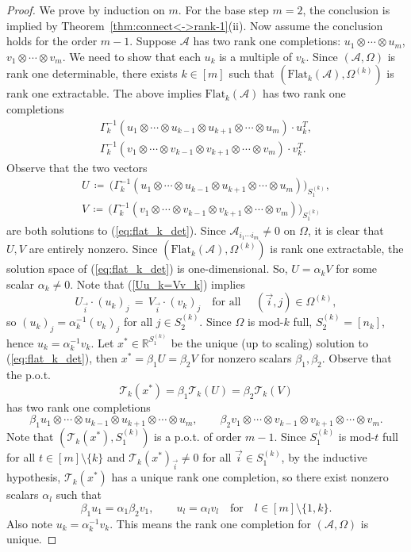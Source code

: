 \documentclass{amsart}
\newcommand{\re}{\mathbb{R}}
\def\af{\alpha}
\def\bt{\beta}
\newcommand{\reff}[1]{(\ref{#1})}
\newcommand{\mc}[1]{\mathcal{#1}}
\newcommand{\Flat}{\mbox{Flat}}
\newcommand{\be}{\begin{equation}}
\newcommand{\ee}{\end{equation}}
\newcommand{\baray}{\begin{array}}
\newcommand{\earay}{\end{array}}
\theoremstyle{definition}
\numberwithin{equation}{section}
\begin{document}
\begin{proof}
We prove by induction on $m$.
For the base step $m=2$, the conclusion is implied by Theorem~\ref{thm:connect<->rank-1}(ii).
Now assume the conclusion holds for the order $m-1$. 
Suppose $\mc{A}$ has two rank one completions:
$u_1 \otimes \cdots \otimes u_m$, $v_1 \otimes \cdots \otimes v_m$.
We need to show that each $u_k$ is a multiple of $v_k$.
Since $(\mc{A}, \Omega)$ is rank one determinable, there exists $k \in [m]$ such that $(\Flat_k(\mc{A}), \Omega^{(k)})$ is rank one extractable. 
The above implies $\Flat_k(\mc{A})$ has two rank one completions
\be\label{Uu_k=Vv_k}
\baray{l}
\Gamma_k^{-1}(u_1 \otimes \cdots \otimes u_{k-1} \otimes u_{k+1} \otimes \cdots \otimes u_m )  \cdot u_k^T, \\
\Gamma_k^{-1}(v_1 \otimes \cdots \otimes v_{k-1} \otimes v_{k+1} \otimes \cdots \otimes v_m ) \cdot v_k^T.
\earay
\ee
Observe that the two vectors
\[
\baray{l}
U \,\coloneqq\, \big( \Gamma_k^{-1}(u_1 \otimes \cdots \otimes u_{k-1} \otimes u_{k+1} \otimes \cdots \otimes u_m )  \big)_{S_1^{(k)}}, \\
V \,\coloneqq\, \big( \Gamma_k^{-1}(v_1 \otimes \cdots \otimes v_{k-1} \otimes v_{k+1} \otimes \cdots \otimes v_m )  \big)_{S_1^{(k)}}
\earay
\]
are both solutions to \reff{eq:flat_k_det}.
Since $\mc{A}_{i_1 \cdots i_m} \ne 0$ on $\Omega$, 
it is clear that $U, V$ are entirely nonzero.
Since $(\Flat_k(\mc{A}), \Omega^{(k)})$ is rank one extractable,
the solution space of  \reff{eq:flat_k_det} is one-dimensional.
So, $U = \af_k V$ for some scalar $\af_k \ne 0$.
Note that \reff{Uu_k=Vv_k} implies
\[
U_{\vec{i}} \cdot (u_k)_j \,=\, V_{\vec{i}} \cdot (v_k)_j
\quad \text{for all } \quad (\vec{i}, j) \in \Omega^{(k)},
\]
so $(u_k)_j = \af_k^{-1} (v_k)_j$ for all $j \in S_2^{(k)}$.
Since $\Omega$ is mod-$k$ full, $S_2^{(k)} = [n_k]$,
hence $u_k = \af_k^{-1} v_k$.
Let $x^* \in \re^{S_1^{(k)}}$ be the unique (up to scaling) solution to  \reff{eq:flat_k_det}, then
$
x^* = \beta_1 U = \beta_2 V
$
for nonzero scalars $\beta_1, \beta_2$.
Observe that the p.o.t. 
\[
\mc{T}_k(x^*) = \beta_1 \mc{T}_k(U) = \beta_2 \mc{T}_k(V)
\]
has two rank one completions
\[
\bt_1 u_1 \otimes \cdots \otimes u_{k-1} \otimes u_{k+1} \otimes \cdots \otimes u_m, \qquad
\bt_2 v_1 \otimes \cdots \otimes v_{k-1} \otimes v_{k+1} \otimes \cdots \otimes v_m.
\]
Note that $(\mc{T}_k(x^*), S_1^{(k)})$ is a p.o.t. of order $m-1$.
Since $S_1^{(k)}$ is mod-$t$ full for all $t \in [m] \setminus \{k\}$ 
and $\mc{T}_k(x^*)_{\vec{i}} \ne 0$ for all $\vec{i} \in S_1^{(k)}$,
by the inductive hypothesis, $\mc{T}_k(x^*)$ has a unique rank one completion, 
so there exist nonzero scalars $\af_l$ such that
\[
\bt_1 u_1 = \af_1  \bt_2v_1 ,  \qquad 
u_l = \af_l v_l \quad \text{for} \quad l \in [m] \setminus \{1, k\}.
\]
Also note $u_k = \af_k^{-1} v_k$.
This means the rank one completion for $(\mc{A}, \Omega)$ is unique.
\end{proof}
\end{document}
